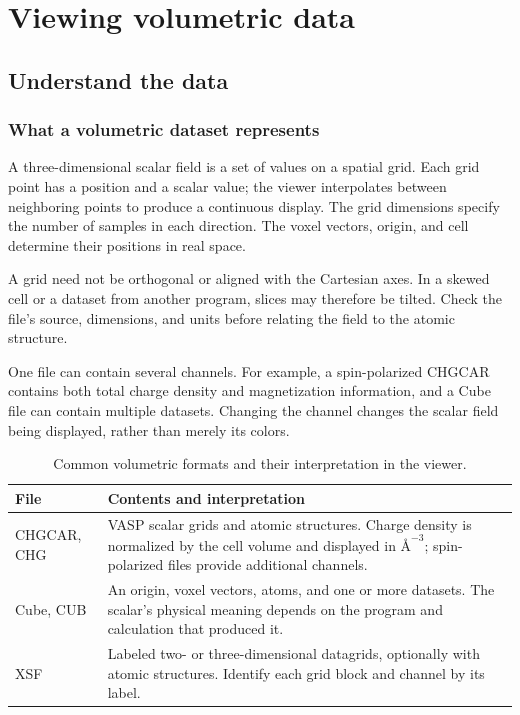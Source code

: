 \chapter{Viewing volumetric data}\label{ch:volume}


\section{Understand the data}

\subsection{What a volumetric dataset represents}

A three-dimensional scalar field is a set of values on a spatial grid. Each grid point has a position and a scalar value; the viewer interpolates between neighboring points to produce a continuous display. The grid dimensions specify the number of samples in each direction. The voxel vectors, origin, and cell determine their positions in real space.

A grid need not be orthogonal or aligned with the Cartesian axes. In a skewed cell or a dataset from another program, slices may therefore be tilted. Check the file's source, dimensions, and units before relating the field to the atomic structure.

One file can contain several channels. For example, a spin-polarized CHGCAR contains both total charge density and magnetization information, and a Cube file can contain multiple datasets. Changing the channel changes the scalar field being displayed, rather than merely its colors.

\begin{table}[htbp]
\centering
\caption{Common volumetric formats and their interpretation in the viewer.}
\begin{tabularx}{\linewidth}{lX}
\toprule
File & Contents and interpretation \\
\midrule
CHGCAR, CHG & VASP scalar grids and atomic structures. Charge density is normalized by the cell volume and displayed in $\text{\AA}^{-3}$; spin-polarized files provide additional channels.\\
Cube, CUB & An origin, voxel vectors, atoms, and one or more datasets. The scalar's physical meaning depends on the program and calculation that produced it.\\
XSF & Labeled two- or three-dimensional datagrids, optionally with atomic structures. Identify each grid block and channel by its label.\\
\bottomrule
\end{tabularx}
\end{table}

